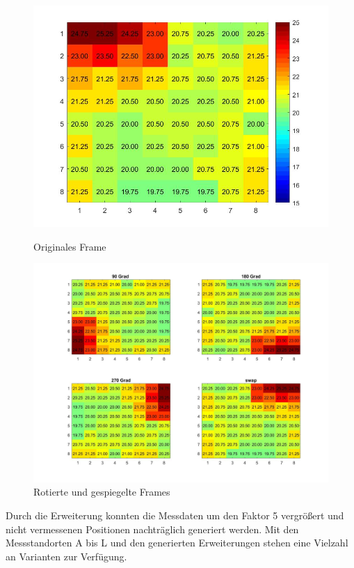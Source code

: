 \begin{figure}[!ht]
	\centering
	\begin{minipage}[c]{0.35\linewidth}
	\centering
	\includegraphics[width=.8\linewidth]{fig/original}
	\caption[Originales Frame]{Originales Frame}
	\label{fig:original}
	\end{minipage}
	\hfill
	\begin{minipage}[c]{0.6\linewidth  }
\includegraphics[width=1\linewidth]{fig/rotated}
\caption[Rotierte und gespiegelte Frames]{Rotierte und gespiegelte Frames}
\label{fig:rotated}
	\end{minipage}
\end{figure}


Durch die Erweiterung konnten die Messdaten um den Faktor 5 vergrößert und nicht vermessenen Positionen nachträglich generiert werden. Mit den Messstandorten A bis L und den generierten Erweiterungen stehen eine Vielzahl an Varianten zur Verfügung. 


